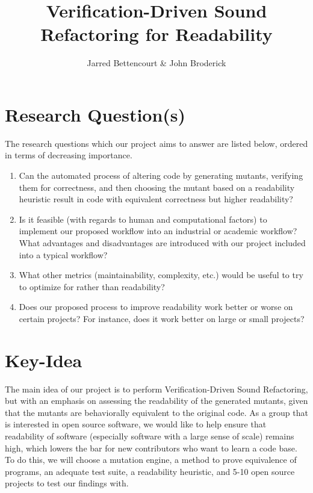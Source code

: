 \documentclass{article}
\title{Verification-Driven Sound Refactoring for Readability}
\author{Jarred Bettencourt \& John Broderick}
\begin{document}
\maketitle



\section{Research Question(s)}

The research questions which our project aims to answer are listed below, ordered in terms of decreasing importance.

\begin{enumerate}
    \item Can the automated process of altering code by generating mutants, verifying them for correctness, and then choosing the mutant based on a readability heuristic result in code with equivalent correctness but higher readability?
    \item Is it feasible (with regards to human and computational factors) to implement our proposed workflow into an industrial or academic workflow? What advantages and disadvantages are introduced with our project included into a typical workflow? 
    \item What other metrics (maintainability, complexity, etc.) would be useful to try to optimize for rather than readability? 
    \item Does our proposed process to improve readability work better or worse on certain projects? For instance, does it work better on large or small projects?
\end{enumerate}

\section{Key-Idea}
The main idea of our project is to perform Verification-Driven Sound Refactoring, but with an emphasis on assessing the readability of the generated mutants, given that the mutants are behaviorally equivalent to the original code. As a group that is interested in open source software, we would like to help ensure that readability of software (especially software with a large sense of scale) remains high, which lowers the bar for new contributors who want to learn a code base. To do this, we will choose a mutation engine, a method to prove equivalence of programs, an adequate test suite, a readability heuristic, and 5-10 open source projects to test our findings with.
\end{document}
